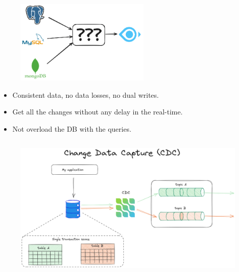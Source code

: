 \documentclass[10pt,utf8]{beamer}
\begin{document}
\begin{frame}
    \begin{figure}
        \centering
        \includegraphics[height=4cm]{./img/db_to_milvus.eps}
    \end{figure}
    \begin{itemize}
      \item Consistent data, no data losses, no dual writes.
      \item Get all the changes without any delay in the real-time.
      \item Not overload the DB with the queries.
    \end{itemize}
\end{frame}

\begin{frame}
    \begin{figure}
        \centering
        \includegraphics[height=7cm]{./img/cdc.eps}
    \end{figure}
\end{frame}
\end{document}

